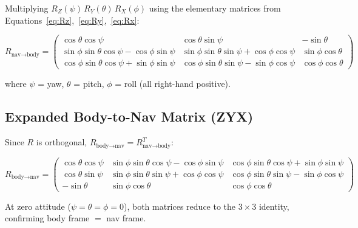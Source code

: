 \documentclass[12pt,a4paper]{article}
\begin{document}
Multiplying $R_Z(\psi)\,R_Y(\theta)\,R_X(\phi)$ using the elementary
matrices from Equations~\eqref{eq:Rz},~\eqref{eq:Ry},~\eqref{eq:Rx}:

\begin{equation}
\boxed{
  R_{\text{nav}\to\text{body}} =
  \begin{pmatrix}
    \cos\theta\cos\psi &
    \cos\theta\sin\psi &
    -\sin\theta \\
    \sin\phi\sin\theta\cos\psi - \cos\phi\sin\psi &
    \sin\phi\sin\theta\sin\psi + \cos\phi\cos\psi &
    \sin\phi\cos\theta \\
    \cos\phi\sin\theta\cos\psi + \sin\phi\sin\psi &
    \cos\phi\sin\theta\sin\psi - \sin\phi\cos\psi &
    \cos\phi\cos\theta
  \end{pmatrix}
}
\label{eq:nav2body}
\end{equation}

where $\psi$ = yaw, $\theta$ = pitch, $\phi$ = roll (all right-hand
positive).

\subsection{Expanded Body-to-Nav Matrix (ZYX)}

Since $R$ is orthogonal, $R_{\text{body}\to\text{nav}} =
R_{\text{nav}\to\text{body}}^T$:

\begin{equation}
\boxed{
  R_{\text{body}\to\text{nav}} =
  \begin{pmatrix}
    \cos\theta\cos\psi &
    \sin\phi\sin\theta\cos\psi - \cos\phi\sin\psi &
    \cos\phi\sin\theta\cos\psi + \sin\phi\sin\psi \\
    \cos\theta\sin\psi &
    \sin\phi\sin\theta\sin\psi + \cos\phi\cos\psi &
    \cos\phi\sin\theta\sin\psi - \sin\phi\cos\psi \\
    -\sin\theta &
    \sin\phi\cos\theta &
    \cos\phi\cos\theta
  \end{pmatrix}
}
\label{eq:body2nav}
\end{equation}

\begin{keybox}
At zero attitude ($\psi=\theta=\phi=0$), both matrices reduce to the
$3\times3$ identity, confirming body frame $=$ nav frame.
\end{keybox}
\end{document}
